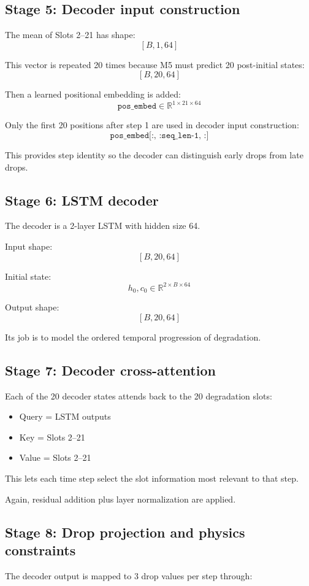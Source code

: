 \documentclass[11pt,a4paper]{article}
\begin{document}
\subsection*{Stage 5: Decoder input construction}
The mean of Slots 2--21 has shape:
$$
[B, 1, 64]
$$

This vector is repeated 20 times because M5 must predict 20 post-initial states:
$$
[B, 20, 64]
$$

Then a learned positional embedding is added:
$$
\texttt{pos\_embed} \in \mathbb{R}^{1 \times 21 \times 64}
$$

Only the first 20 positions after step 1 are used in decoder input construction:
$$
\texttt{pos\_embed[:, :seq\_len-1, :]}
$$

This provides step identity so the decoder can distinguish early drops from late drops.

\subsection*{Stage 6: LSTM decoder}
The decoder is a 2-layer LSTM with hidden size 64.

Input shape:
$$
[B, 20, 64]
$$

Initial state:
$$
h_0, c_0 \in \mathbb{R}^{2 \times B \times 64}
$$

Output shape:
$$
[B, 20, 64]
$$

Its job is to model the ordered temporal progression of degradation.

\subsection*{Stage 7: Decoder cross-attention}
Each of the 20 decoder states attends back to the 20 degradation slots:

\begin{itemize}[nosep]
    \item Query = LSTM outputs
    \item Key = Slots 2--21
    \item Value = Slots 2--21
\end{itemize}

This lets each time step select the slot information most relevant to that step.

Again, residual addition plus layer normalization are applied.

\subsection*{Stage 8: Drop projection and physics constraints}
The decoder output is mapped to 3 drop values per step through:
\end{document}
